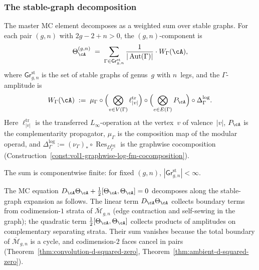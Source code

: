 \subsubsection{The stable-graph decomposition}

\begin{construction}
\label{constr:stable-graph-decomposition}
\ClaimStatusProvedHere
{}
The master MC element decomposes as a weighted sum
over stable graphs.
For each pair $(g,n)$ with $2g - 2 + n > 0$, the
$(g,n)$-component is
\begin{equation}\label{eq:stable-graph-decomposition}
\Theta_\cA^{(g,n)}
\;=\;
\sum_{\Gamma \in \mathsf{Gr}^{\mathrm{st}}_{g,n}}
\frac{1}{|\operatorname{Aut}(\Gamma)|}
\cdot W_\Gamma(\cA),
\end{equation}
where $\mathsf{Gr}^{\mathrm{st}}_{g,n}$ is the set of
stable graphs of genus~$g$ with $n$~legs, and the
$\Gamma$-amplitude is
\begin{equation}\label{eq:gamma-amplitude}
W_\Gamma(\cA)
\;:=\;
\mu_\Gamma
\circ
\Bigl(
\bigotimes_{v \in V(\Gamma)}
\ell^{\mathrm{tr}}_{|v|}
\Bigr)
\circ
\Bigl(
\bigotimes_{e \in E(\Gamma)} P_\cA
\Bigr)
\circ
\Delta^{\log}_\Gamma.
\end{equation}
Here $\ell^{\mathrm{tr}}_{|v|}$ is the transferred
$L_\infty$-operation at the vertex~$v$
of valence~$|v|$, $P_\cA$ is the complementarity
propagator, $\mu_\Gamma$ is the composition map of the
modular operad, and
$\Delta^{\log}_\Gamma
:= (\nu_\Gamma)_* \circ
\operatorname{Res}_{D^{\log}_\Gamma}$
is the graphwise cocomposition
\textup{(}Construction~\textup{\ref{const:vol1-graphwise-log-fm-cocomposition}}\textup{)}.

The sum is componentwise finite: for fixed $(g,n)$,
$|\mathsf{Gr}^{\mathrm{st}}_{g,n}| < \infty$.
\end{construction}

\begin{remark}
\label{rem:mc-codimension-two}
The MC equation
$D_\cA \Theta_\cA + \tfrac{1}{2}[\Theta_\cA, \Theta_\cA] = 0$
decomposes along the stable-graph expansion as follows.
The linear term $D_\cA \Theta_\cA$ collects boundary
terms from codimension-$1$ strata of $\overline{\mathcal{M}}_{g,n}$
(edge contraction and self-sewing in the graph); the quadratic
term $\tfrac{1}{2}[\Theta_\cA, \Theta_\cA]$ collects
products of amplitudes on complementary separating strata.
Their sum vanishes because the total boundary of
$\overline{\mathcal{M}}_{g,n}$ is a cycle, and codimension-$2$
faces cancel in pairs
(Theorem~\ref{thm:convolution-d-squared-zero},
Theorem~\ref{thm:ambient-d-squared-zero}).
\end{remark}


